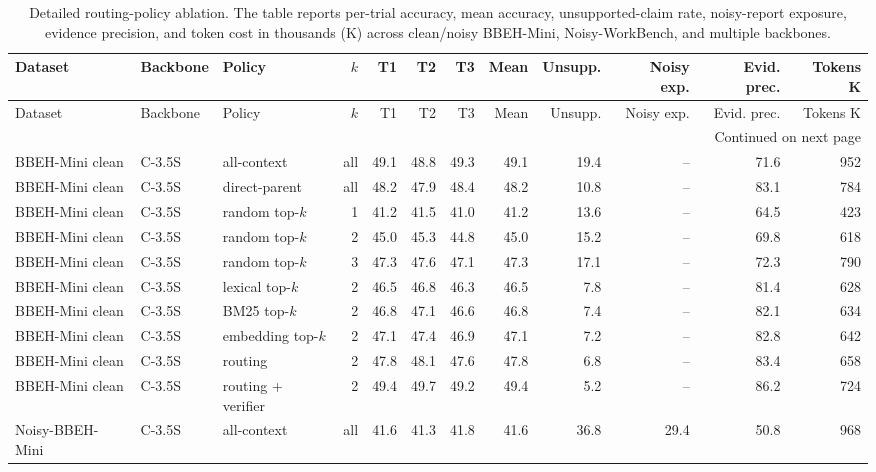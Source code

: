 ﻿\begingroup
\scriptsize
\setlength{\tabcolsep}{2.2pt}
\setlength{\LTleft}{\fill}
\setlength{\LTright}{\fill}
\begin{longtable}{lllrrrrrrrrr}
\caption{Detailed routing-policy ablation. The table reports per-trial accuracy, mean accuracy, unsupported-claim rate, noisy-report exposure, evidence precision, and token cost in thousands (K) across clean/noisy BBEH-Mini, Noisy-WorkBench, and multiple backbones.}\label{tab:routing-ablation-detailed}\\
\toprule
Dataset & Backbone & Policy & $k$ & T1 & T2 & T3 & Mean & Unsupp. & Noisy exp. & Evid. prec. & Tokens K \\
\midrule
\endfirsthead
\toprule
Dataset & Backbone & Policy & $k$ & T1 & T2 & T3 & Mean & Unsupp. & Noisy exp. & Evid. prec. & Tokens K \\
\midrule
\endhead
\midrule
\multicolumn{12}{r}{\scriptsize Continued on next page}\\
\endfoot
\bottomrule
\endlastfoot
BBEH-Mini clean & C-3.5S & all-context & all & 49.1 & 48.8 & 49.3 & 49.1 & 19.4 & -- & 71.6 & 952 \\
BBEH-Mini clean & C-3.5S & direct-parent & all & 48.2 & 47.9 & 48.4 & 48.2 & 10.8 & -- & 83.1 & 784 \\
BBEH-Mini clean & C-3.5S & random top-$k$ & 1 & 41.2 & 41.5 & 41.0 & 41.2 & 13.6 & -- & 64.5 & 423 \\
BBEH-Mini clean & C-3.5S & random top-$k$ & 2 & 45.0 & 45.3 & 44.8 & 45.0 & 15.2 & -- & 69.8 & 618 \\
BBEH-Mini clean & C-3.5S & random top-$k$ & 3 & 47.3 & 47.6 & 47.1 & 47.3 & 17.1 & -- & 72.3 & 790 \\
BBEH-Mini clean & C-3.5S & lexical top-$k$ & 2 & 46.5 & 46.8 & 46.3 & 46.5 & 7.8 & -- & 81.4 & 628 \\
BBEH-Mini clean & C-3.5S & BM25 top-$k$ & 2 & 46.8 & 47.1 & 46.6 & 46.8 & 7.4 & -- & 82.1 & 634 \\
BBEH-Mini clean & C-3.5S & embedding top-$k$ & 2 & 47.1 & 47.4 & 46.9 & 47.1 & 7.2 & -- & 82.8 & 642 \\
BBEH-Mini clean & C-3.5S & \method{} routing & 2 & 47.8 & 48.1 & 47.6 & 47.8 & 6.8 & -- & 83.4 & 658 \\
\rowcolor{tracesoft}
BBEH-Mini clean & C-3.5S & \method{} routing + verifier & 2 & 49.4 & 49.7 & 49.2 & 49.4 & 5.2 & -- & 86.2 & 724 \\
\midrule
Noisy-BBEH-Mini & C-3.5S & all-context & all & 41.6 & 41.3 & 41.8 & 41.6 & 36.8 & 29.4 & 50.8 & 968 \\

\end{longtable}
